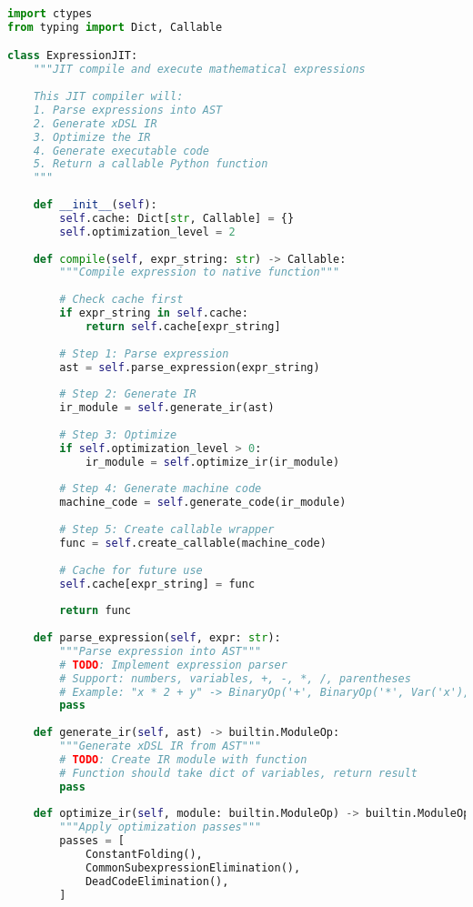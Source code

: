 \documentclass[11pt,a4paper]{article}
\begin{document}
\begin{lstlisting}[language=Python, caption=Exercise: JIT Compiler]
import ctypes
from typing import Dict, Callable

class ExpressionJIT:
    """JIT compile and execute mathematical expressions
    
    This JIT compiler will:
    1. Parse expressions into AST
    2. Generate xDSL IR
    3. Optimize the IR
    4. Generate executable code
    5. Return a callable Python function
    """
    
    def __init__(self):
        self.cache: Dict[str, Callable] = {}
        self.optimization_level = 2
    
    def compile(self, expr_string: str) -> Callable:
        """Compile expression to native function"""
        
        # Check cache first
        if expr_string in self.cache:
            return self.cache[expr_string]
        
        # Step 1: Parse expression
        ast = self.parse_expression(expr_string)
        
        # Step 2: Generate IR
        ir_module = self.generate_ir(ast)
        
        # Step 3: Optimize
        if self.optimization_level > 0:
            ir_module = self.optimize_ir(ir_module)
        
        # Step 4: Generate machine code
        machine_code = self.generate_code(ir_module)
        
        # Step 5: Create callable wrapper
        func = self.create_callable(machine_code)
        
        # Cache for future use
        self.cache[expr_string] = func
        
        return func
    
    def parse_expression(self, expr: str):
        """Parse expression into AST"""
        # TODO: Implement expression parser
        # Support: numbers, variables, +, -, *, /, parentheses
        # Example: "x * 2 + y" -> BinaryOp('+', BinaryOp('*', Var('x'), Num(2)), Var('y'))
        pass
    
    def generate_ir(self, ast) -> builtin.ModuleOp:
        """Generate xDSL IR from AST"""
        # TODO: Create IR module with function
        # Function should take dict of variables, return result
        pass
    
    def optimize_ir(self, module: builtin.ModuleOp) -> builtin.ModuleOp:
        """Apply optimization passes"""
        passes = [
            ConstantFolding(),
            CommonSubexpressionElimination(),
            DeadCodeElimination(),
        ]
        

\end{lstlisting}
\end{document}

